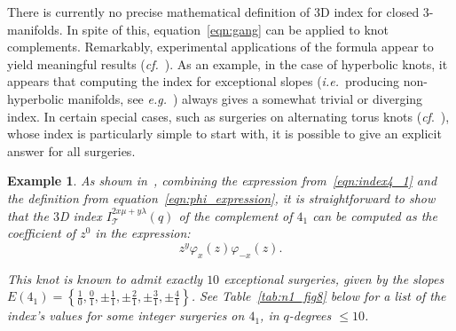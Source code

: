 \documentclass[11pt]{amsart}
\newtheorem{example}[thm]{Example}
\begin{document}
There is currently no precise mathematical definition of $3$D index for closed $3$-manifolds. In spite of this, equation~\eqref{eqn:gang} can be applied to knot complements. Remarkably, experimental applications of the formula appear to yield meaningful results (\textit{cf.}~\cite[Sec.~13]{3dindexdehn}). As an example, in the case of hyperbolic knots, it appears that computing the index for exceptional slopes (\emph{i.e.}~producing non-hyperbolic manifolds, see \textit{e.g.}~\cite{dunfield2020census}) always gives a somewhat trivial or diverging index.
In certain special cases, such as surgeries on alternating torus knots (\emph{cf}.~\cite[Sec.~13.1]{3dindexdehn}), whose index is particularly simple to start with, it is possible to give an explicit answer for all surgeries.

\begin{example}
As shown in~\cite[Sec.~13.2]{3dindexdehn},
combining the expression from~\eqref{eqn:index4_1} and the definition from equation~\eqref{eqn:phi_expression}, it is straightforward to show that the $3$D index $I_\mathcal{T}^{2x\mu+ y\lambda} \left(q\right)$ of the complement of $4_1$ can be computed as the coefficient of $z^0$ in the expression:
$$z^y \varphi_x \left(z\right) \varphi_{-x} \left(z\right).$$

This knot is known to admit exactly $10$ exceptional surgeries, given by the slopes
$E\left(4_1\right) = \left\{\frac{1}{0}, \frac01, \pm\frac11, \pm\frac21, \pm \frac31, \pm\frac41\right\}$.
See Table~\ref{tab:n1_fig8} below for a list of the index's values for some integer
surgeries on $4_1$, in $q$-degrees $\le 10$.


\end{example}
\end{document}
